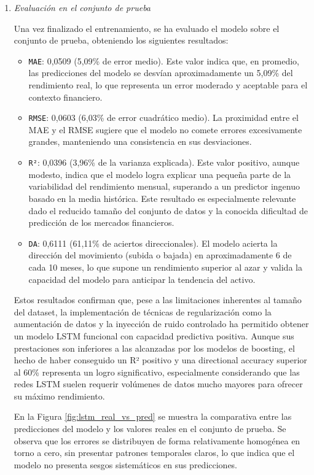 \begin{enumerate}
    \item \emph{Evaluación en el conjunto de prueba}

    Una vez finalizado el entrenamiento, se ha evaluado el modelo sobre el conjunto de prueba, obteniendo los siguientes resultados:

    \begin{itemize}
        \item \texttt{MAE}: 0,0509 (5,09\% de error medio). Este valor indica que, en promedio, las predicciones del modelo se desvían aproximadamente un 5,09\% del rendimiento real, lo que representa un error moderado y aceptable para el contexto financiero.
        \item \texttt{RMSE}: 0,0603 (6,03\% de error cuadrático medio). La proximidad entre el MAE y el RMSE sugiere que el modelo no comete errores excesivamente grandes, manteniendo una consistencia en sus desviaciones.
        \item \texttt{R²}: 0,0396 (3,96\% de la varianza explicada). Este valor positivo, aunque modesto, indica que el modelo logra explicar una pequeña parte de la variabilidad del rendimiento mensual, superando a un predictor ingenuo basado en la media histórica. Este resultado es especialmente relevante dado el reducido tamaño del conjunto de datos y la conocida dificultad de predicción de los mercados financieros.
        \item \texttt{DA}: 0,6111 (61,11\% de aciertos direccionales). El modelo acierta la dirección del movimiento (subida o bajada) en aproximadamente 6 de cada 10 meses, lo que supone un rendimiento superior al azar y valida la capacidad del modelo para anticipar la tendencia del activo.
    \end{itemize}

    Estos resultados confirman que, pese a las limitaciones inherentes al tamaño del dataset, la implementación de técnicas de regularización como la aumentación de datos y la inyección de ruido controlado ha permitido obtener un modelo LSTM funcional con capacidad predictiva positiva. Aunque sus prestaciones son inferiores a las alcanzadas por los modelos de boosting, el hecho de haber conseguido un R² positivo y una directional accuracy superior al 60\% representa un logro significativo, especialmente considerando que las redes LSTM suelen requerir volúmenes de datos mucho mayores para ofrecer su máximo rendimiento.

    En la Figura \ref{fig:lstm_real_vs_pred} se muestra la comparativa entre las predicciones del modelo y los valores reales en el conjunto de prueba. Se observa que los errores se distribuyen de forma relativamente homogénea en torno a cero, sin presentar patrones temporales claros, lo que indica que el modelo no presenta sesgos sistemáticos en sus predicciones.


\end{enumerate}
